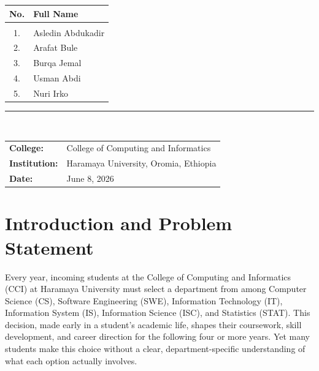 \documentclass[12pt, a4paper]{article}
\begin{document}
\begin{titlepage}
\begin{center}
\begin{tcolorbox}[
    enhanced, 
    colback=lightblue, 
    colframe=uniblue,
    arc=4pt, 
    boxrule=1pt, 
    width=0.82\textwidth,
    top=6pt, 
    bottom=6pt, 
    left=10pt, 
    right=10pt
]
\begin{flushleft}
\begin{tabular}{cl}
\textbf{\textcolor{uniblue}{No.}} & \textbf{\textcolor{uniblue}{Full Name}} \\[3pt]
\hline\\[-7pt]
1. & Asledin Abdukadir \\[2pt]
2. & Arafat Bule \\[2pt]
3. & Burqa Jemal \\[2pt]
4. & Usman Abdi \\[2pt]
5. & Nuri Irko \\[2pt]
\end{tabular}

\vspace{0.2cm}
\textcolor{uniblue}{\rule{0.70\textwidth}{0.5pt}}\\[0.15cm]

\begin{tabular}{ll}
\textbf{\textcolor{uniblue}{College:}}     & College of Computing and Informatics \\[2pt]
\textbf{\textcolor{uniblue}{Institution:}} & Haramaya University, Oromia, Ethiopia \\[2pt]
\textbf{\textcolor{uniblue}{Date:}}        & June 8, 2026 \\[2pt]
\end{tabular}
\end{flushleft}
\end{tcolorbox}

\end{center}
\end{titlepage}

\tableofcontents
\newpage

\section{Introduction and Problem Statement}

Every year, incoming students at the College of Computing and Informatics (CCI) at Haramaya University must select a department from among Computer Science (CS), Software Engineering (SWE), Information Technology (IT), Information System (IS), Information Science (ISC), and Statistics (STAT). This decision, made early in a student's academic life, shapes their coursework, skill development, and career direction for the following four or more years. Yet many students make this choice without a clear, department-specific understanding of what each option actually involves.
\end{document}
